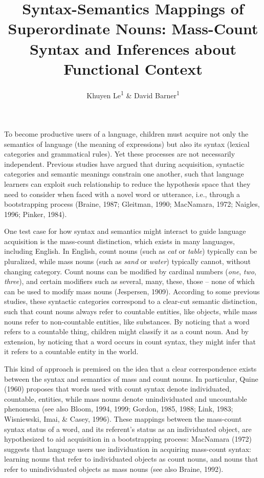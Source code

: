 \documentclass[
  man,floatsintext]{apa6}
\title{Syntax-Semantics Mappings of Superordinate Nouns: Mass-Count Syntax and Inferences about Functional Context}
\author{Khuyen Le\textsuperscript{1} \& David Barner\textsuperscript{1}}
\date{}
\affiliation{\vspace{0.5cm}\textsuperscript{1} University of California, San Diego}
\begin{document}
\maketitle

To become productive users of a language, children must acquire not only the semantics of language (the meaning of expressions) but also its syntax (lexical categories and grammatical rules). Yet these processes are not necessarily independent. Previous studies have argued that during acquisition, syntactic categories and semantic meanings constrain one another, such that language learners can exploit such relationship to reduce the hypothesis space that they need to consider when faced with a novel word or utterance, i.e., through a bootstrapping process (Braine, 1987; Gleitman, 1990; MacNamara, 1972; Naigles, 1996; Pinker, 1984).

One test case for how syntax and semantics might interact to guide language acquisition is the mass-count distinction, which exists in many languages, including English. In English, count nouns (such as \emph{cat} or \emph{table}) typically can be pluralized, while mass nouns (such as \emph{sand} or \emph{water}) typically cannot, without changing category. Count nouns can be modified by cardinal numbers (\emph{one}, \emph{two}, \emph{three}), and certain modifiers such as several, many, these, those -- none of which can be used to modify mass nouns (Jespersen, 1909). According to some previous studies, these syntactic categories correspond to a clear-cut semantic distinction, such that count nouns always refer to countable entities, like objects, while mass nouns refer to non-countable entities, like substances. By noticing that a word refers to a countable thing, children might classify it as a count noun. And by extension, by noticing that a word occurs in count syntax, they might infer that it refers to a countable entity in the world.

This kind of approach is premised on the idea that a clear correspondence exists between the syntax and semantics of mass and count nouns. In particular, Quine (1960) proposes that words used with count syntax denote individuated, countable, entities, while mass nouns denote unindividuated and uncountable phenomena (see also Bloom, 1994, 1999; Gordon, 1985, 1988; Link, 1983; Wisniewski, Imai, \& Casey, 1996). These mappings between the mass-count syntax status of a word, and its referent's status as an individuated object, are hypothesized to aid acquisition in a bootstrapping process: MacNamara (1972) suggests that language users use individuation in acquiring mass-count syntax: learning nouns that refer to individuated objects as count nouns, and nouns that refer to unindividuated objects as mass nouns (see also Braine, 1992).
\end{document}
